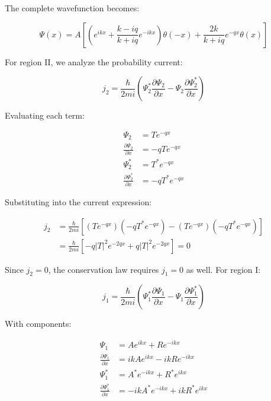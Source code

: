 \documentclass[italian]{HKNdocument}
\begin{document}
The complete wavefunction becomes:

\begin{equation}
\Psi(x)=A\left[\left(e^{i k x}+\frac{k-i q}{k+i q} e^{-i k x}\right) \theta(-x)+\frac{2 k}{k+i q} e^{-q x} \theta(x)\right]
\end{equation}

For region II, we analyze the probability current:

\begin{equation}
j_{2}=\frac{\hbar}{2 m i}\left(\Psi_{2}^{*} \frac{\partial \Psi_{2}}{\partial x}-\Psi_{2} \frac{\partial \Psi_{2}^{*}}{\partial x}\right)
\end{equation}

Evaluating each term:

\begin{align}
\Psi_{2} & =T e^{-q x} \\
\frac{\partial \Psi_{2}}{\partial x} & =-q T e^{-q x} \\
\Psi_{2}^{*} & =T^{*} e^{-q x}  \\
\frac{\partial \Psi_{2}^{*}}{\partial x} & =-q T^{*} e^{-q x}
\end{align}

Substituting into the current expression:

\begin{align}
j_{2} & =\frac{\hbar}{2 m i}\left[\left(T e^{-q x}\right)\left(-q T^{*} e^{-q x}\right)-\left(T e^{-q x}\right)\left(-q T^{*} e^{-q x}\right)\right] \\
& =\frac{\hbar}{2 m i}\left[-q|T|^{2} e^{-2 q x}+q|T|^{2} e^{-2 q x}\right]=0
\end{align}

Since $j_2 = 0$, the conservation law requires $j_1 = 0$ as well. For region I:

\begin{equation}
j_{1}=\frac{\hbar}{2 m i}\left(\Psi_{1}^{*} \frac{\partial \Psi_{1}}{\partial x}-\Psi_{1} \frac{\partial \Psi_{1}^{*}}{\partial x}\right)
\end{equation}

With components:

\begin{align}
\Psi_{1} & =A e^{i k x}+R e^{-i k x} \\
\frac{\partial \Psi_{1}}{\partial x} & =i k A e^{i k x}-i k R e^{-i k x}  \\
\Psi_{1}^{*} & =A^{*} e^{-i k x}+R^{*} e^{i k x} \\
\frac{\partial \Psi_{1}^{*}}{\partial x} & =-i k A^{*} e^{-i k x}+i k R^{*} e^{i k x}
\end{align}
\end{document}
